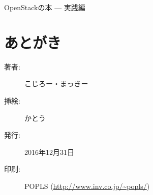 \documentclass[9pt,b5paper,openany]{jsbook}
\begin{document}
{\Huge OpenStackの本 --- 実践編}

\begin{minipage}{\textwidth}
	\tableofcontents
\end{minipage}

\thispagestyle{empty}





\chapter{あとがき}

\begin{minipage}{0.5\paperwidth}
	\begin{description}
		\item[著者:]こじろー・まっきー
		\item[挿絵:]かとう
		\item[発行:]2016年12月31日
		\item[印刷:]POPLS (\url{http://www.inv.co.jp/~popls/})
	\end{description}
\end{minipage}
\end{document}
